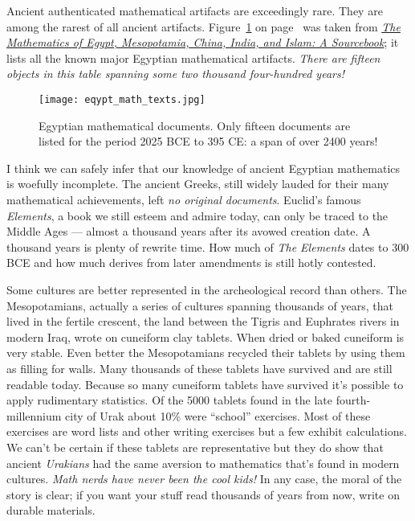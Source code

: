 Ancient authenticated mathematical artifacts are exceedingly rare. They
are among the rarest of all ancient artifacts. Figure~\ref{fig:7765x1} on page~\pageref{fig:7765x1} was
taken from
\href{https://press.princeton.edu/books/hardcover/9780691114859/the-mathematics-of-egypt-mesopotamia-china-india-and-islam}{\emph{The
Mathematics of Egypt, Mesopotamia, China, India, and Islam: A
Sourcebook}}; it lists all the known major Egyptian mathematical
artifacts. \emph{There are fifteen objects in this table spanning some
two thousand four-hundred years!}
\captionsetup[figure]{labelformat=default}
\begin{figure}[htbp]
 \centering
\texttt{[image: eqypt\_math\_texts.jpg]}
\caption[Egyptian mathematical documents]{Egyptian mathematical documents. Only fifteen documents are listed for the period  2025 BCE to 395 CE: a span of over 2400 years!}
\label{fig:7765x1}
\end{figure}
I think we can safely infer that our knowledge of ancient Egyptian
mathematics is woefully incomplete. The ancient Greeks, still widely
lauded for their many mathematical achievements,  left \emph{no
original documents}. Euclid's famous \emph{Elements}, a book we still
esteem and admire today, can only be traced to the Middle Ages --- almost
a thousand years after its avowed creation date. A thousand years is
plenty of rewrite time. How much of \emph{The Elements} dates to 300 BCE
and how much derives from later amendments is still hotly contested.

Some cultures are better represented in the archeological record than
others. The Mesopotamians, actually a series of cultures spanning
thousands of years, that lived in the fertile crescent, the land between
the Tigris and Euphrates rivers in modern Iraq, wrote on cuneiform clay
tablets. When dried or baked cuneiform is very stable. Even better the
Mesopotamians recycled their tablets by using them as filling for walls.
Many thousands of these tablets have survived and are still readable
today. Because so many cuneiform tablets have survived it's possible to
apply rudimentary statistics. Of the 5000 tablets found in the late
fourth-millennium city of Urak about 10\% were ``school'' exercises.
Most of these exercises are word lists and other writing exercises but a
few exhibit calculations. We can't be certain if these tablets are
representative but they do show that ancient \emph{Urakians} had the
same aversion to mathematics that's found in modern cultures. \emph{Math
nerds have never been the cool kids!} In any case, the moral of the
story is clear; if you want your stuff read thousands of years from now,
write on durable materials.

